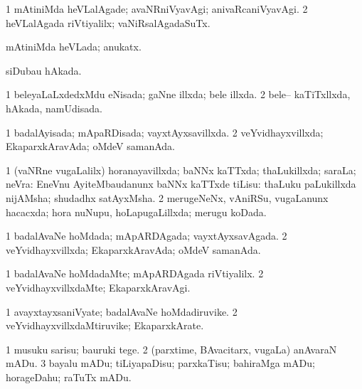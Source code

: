 {{\bentry
{} 
\gl{\kirxvi}
\expl{}
\bmng
\bnum
\num{1} mAtiniMda heVLalAgade; avaNRniVyavAgi; anivaRcaniVyavAgi. 
\num{2} heVLalAgada riVtiyalilx; vaNiRsalAgadaSuTx. 
\enum
\emng
\eentry

\bentry
{} 
\gl{\gu}
\expl{}
\bmng
mAtiniMda heVLada; anukatx. 
\emng
\eentry

\bentry
{} 
\gl{\gu}
\expl{}
\bmng
siDubau hAkada. 
\emng
\eentry

\bentry
{} 
\gl{\gu}
\expl{}
\bmng
\bnum
\num{1} beleyaLaLxdedxMdu eNisada; gaNne illxda; bele illxda. 
\num{2} bele-- kaTiTxllxda, hAkada, namUdisada. 
\enum
\emng
\eentry

\bentry
{} 
\gl{\gu}
\expl{}
\bmng
\bnum
\num{1} badalAyisada; mApaRDisada; vayxtAyxsavillxda. 
\num{2} veYvidhayxvillxda; EkaparxkAravAda; oMdeV samanAda. 
\enum
\emng
\eentry

\bentry
{} 
\gl{\gu}
\expl{}
\bmng
\bnum
\num{1} (vaNRne \mo vugaLalilx) horanayavillxda; baNNx kaTTxda; thaLukillxda; saraLa; neVra:  EneVnu AyiteMbaudanunx baNNx kaTTxde tiLisu:  thaLuku paLukillxda nijAMsha; shudadhx satAyxMsha. 
\num{2} merugeNeNx, vAniRSu, \mo vugaLanunx hacacxda; hora nuNupu, hoLapugaLillxda; merugu koDada. 
\enum
\emng
\eentry

\bentry
{} 
\gl{\gu}
\expl{}
\bmng
\bnum
\num{1} badalAvaNe hoMdada; mApARDAgada; vayxtAyxsavAgada. 
\num{2} veYvidhayxvillxda; EkaparxkAravAda; oMdeV samanAda. 
\enum
\emng
\eentry

\bentry
{} 
\gl{\kirxvi}
\expl{}
\bmng
\bnum
\num{1} badalAvaNe hoMdadaMte; mApARDAgada riVtiyalilx. 
\num{2} veYvidhayxvillxdaMte; EkaparxkAravAgi. 
\enum
\emng
\eentry

\bentry
{} 
\gl{\nA}
\expl{}
\bmng
\bnum
\num{1} avayxtayxsaniVyate; badalAvaNe hoMdadiruvike. 
\num{2} veYvidhayxvillxdaMtiruvike; EkaparxkArate. 
\enum
\emng
\eentry

\bentry
{} 
\gl{\sakirx}
\expl{}
\bmng
\bnum
\num{1} musuku sarisu; bauruki tege. 
\num{2} (parxtime, BAvacitarx, \mo vugaLa) anAvaraN mADu. 
\num{3} bayalu mADu; tiLiyapaDisu; parxkaTisu; bahiraMga mADu; horageDahu; raTuTx mADu. 
\enum
\emng

}}
